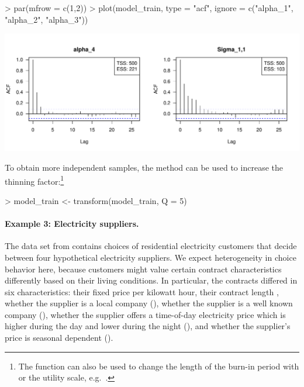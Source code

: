 \documentclass[article,shortnames]{jss}
\newcommand{\fct}[1]{\code{#1()}}
\begin{document}
\begin{Schunk}
\begin{Sinput}
> par(mfrow = c(1,2))
> plot(model_train, type = "acf", ignore = c("alpha_1", "alpha_2", "alpha_3"))
\end{Sinput}
\end{Schunk}
\includegraphics{rprobitb_oelschlaeger_bauer-model-train-acf}

To obtain more independent samples, the \fct{transform} method can be used to increase the thinning factor:\footnote{The function can also be used to change the length of the burn-in period with  or the utility scale, e.g.\ .}

\begin{Schunk}
\begin{Sinput}
> model_train <- transform(model_train, Q = 5)
\end{Sinput}
\end{Schunk}

\paragraph{Example 3: Electricity suppliers.}

The  data set from  contains choices of residential electricity customers that decide between four hypothetical electricity suppliers. We expect heterogeneity in choice behavior here, because customers might value certain contract characteristics differently based on their living conditions. In particular, the contracts differed in six characteristics: their fixed price  per kilowatt hour, their contract length , whether the supplier is a local company (), whether the supplier is a well known company (), whether the supplier offers a time-of-day electricity price which is higher during the day and lower during the night (), and whether the supplier's price is seasonal dependent ().
\end{document}
